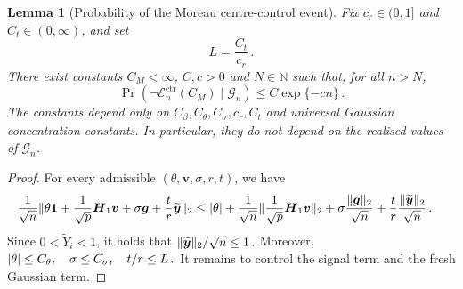 \documentclass{article}
\makeatletter
\newtheorem{lemma}{Lemma}
\theoremstyle{definition}
\newcommand{\vnorm}[1]{%
	\ensuremath{%
		\if@display
		\left\| #1 \right\|
		\else
		\| #1 \|
		\fi
	}%
}
\newcommand{\abs}[1]{%
	\ensuremath{%
		\if@display
		\left| #1 \right|
		\else
		\lvert #1 \rvert
		\fi
	}%
}
\newcommand*{\bb}{\boldsymbol}
\def\bH {\bb{H}}
\def\bv{\bb{v}}
\def\bg{\bb{g}}
\def\Ytil{\widetilde{Y}}
\def\bYtil{\widetilde{\bb{y}}}
\def\bH{\bb{H}}
\makeatother
\begin{document}
\begin{bibunit}
\begin{lemma}[Probability of the Moreau centre-control event]
	\label{lemma:moreau_center_probability}
	Fix $c_r\in(0,1]$ and $C_t\in(0,\infty)$, and set
	$$
		L=\frac{C_t}{c_r}\,.
	$$
	There exist constants $C_M<\infty$, $C,c>0$ and $N\in\mathbb N$ such that, for all $n>N$,
	$$
		\Pr\left(
			\lnot\mathcal E_n^{\mathrm{ctr}}(C_M)
			\mid
			\mathcal G_n
		\right)
		\leq
		C\exp\{-cn\}\,.
	$$
	The constants depend only on $C_\beta,C_\theta,C_\sigma,c_r,C_t$
	and universal Gaussian concentration constants. In particular, they do not depend on the realised values of $\mathcal G_n$.
\end{lemma}

\begin{proof}
	For every admissible $(\theta,\bv,\sigma,r,t)$, we have
	$$
		\begin{aligned}
		&\frac1{\sqrt n}
		\vnorm{
			\theta\bb1
			+
			\frac1{\sqrt p}\bH_1\bv
			+
			\sigma\bg
			+
			\frac tr\bYtil
		}_2\leq
		\abs{\theta}
		+
		\frac1{\sqrt n}
		\vnorm{
			\frac1{\sqrt p}\bH_1\bv
		}_2
		+
		\sigma\frac{\vnorm{\bg}_2}{\sqrt n}
		+
		\frac tr\frac{\vnorm{\bYtil}_2}{\sqrt n}\,.
		\end{aligned}
	$$
		Since $0<\Ytil_i<1$, it holds that $\vnorm{\bYtil}_2/\sqrt n\leq 1\,.$
		Moreover, $\abs{\theta}\leq C_\theta,\quad \sigma\leq C_\sigma,\quad t/r\leq L\,.$
	It remains to control the signal term and the fresh Gaussian term.


\end{proof}
\end{bibunit}
\end{document}
